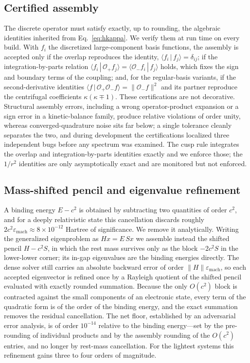 \documentclass[aps,pra,twocolumn,superscriptaddress,showpacs,floatfix,longbibliography]{revtex4-2}
\newcommand{\Op}{\ensuremath{\mathcal{O}}}
\begin{document}
\subsection{Certified assembly}

The discrete operator must satisfy exactly, up to rounding, the algebraic
identities inherited from Eq.~\eqref{eq:hkappa}. We verify them at run
time on every build. With $f_{i}$ the discretized large-component basis
functions, the assembly is accepted only if the overlap reproduces the
identity, $\langle f_{i}\,|\,f_{j}\rangle=\delta_{ij}$; if the
integration-by-parts relation $\langle f_{i}\,|\,\Op_{+}f_{j}\rangle=
\langle\Op_{-}f_{i}\,|\,f_{j}\rangle$ holds, which fixes the sign and
boundary terms of the coupling; and, for the regular-basis variants, if
the second-derivative identities $\langle f\,|\,\Op_{+}\Op_{-}f\rangle=
\lVert\Op_{-}f\rVert^{2}$ and its partner reproduce the centrifugal
coefficients $\kappa(\kappa\mp1)$. These certifications are not
decorative. Structural assembly errors, including a wrong operator-product
expansion or a sign error in a kinetic-balance family, produce relative
violations of order unity, whereas converged-quadrature noise sits far
below; a single tolerance cleanly separates the two, and during
development the certifications localized three independent bugs before any
spectrum was examined. The cusp rule integrates the overlap and
integration-by-parts identities exactly and we enforce those; the
$1/r^{2}$ identities are only asymptotically exact and are monitored but
not enforced.

\subsection{Mass-shifted pencil and eigenvalue refinement}
\label{sec:pencil}

A binding energy $E-c^{2}$ is obtained by subtracting two quantities of
order $c^{2}$, and for a deeply relativistic state this cancellation
discards roughly $2c^{2}\varepsilon_{\mathrm{mach}}\approx8\times10^{-12}$
Hartree of significance. We remove it analytically. Writing the
generalized eigenproblem as $Hx=E\,Sx$ we assemble instead the shifted
pencil $H-c^{2}S$, in which the rest mass survives only as the block
$-2c^{2}S$ in the lower-lower corner; its in-gap eigenvalues are the
binding energies directly. The dense solver still carries an absolute
backward error of order $\lVert H\rVert\varepsilon_{\mathrm{mach}}$, so
each accepted eigenvector is refined once by a Rayleigh quotient of the
shifted pencil evaluated with exactly rounded summation. Because the only
$O(c^{2})$ block is contracted against the small components of an
electronic state, every term of the quadratic form is of the order of the
binding energy, and the exact summation removes the residual cancellation.
The net floor, established by an adversarial error analysis, is of order
$10^{-14}$ relative to the binding energy---set by the pre-rounding of
individual products and by the assembly rounding of the $O(c^{2})$
entries, and no longer by rest-mass cancellation. For the lightest systems
this refinement gains three to four orders of magnitude.
\end{document}
